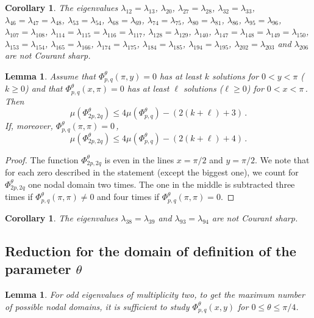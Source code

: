 \documentclass[a4paper,reqno,11pt]{amsart}
\newtheorem{lemma}[thm]{Lemma}
\newtheorem{cor}[thm]{Corollary}
\theoremstyle{remark}
\theoremstyle{definition}
\numberwithin{equation}{section}
\begin{document}
\begin{cor}
\label{cor:antimirror}
The eigenvalues 
$\lambda_{12}=\lambda_{13}$, 
$\lambda_{20}$, 
$\lambda_{27}=\lambda_{28}$, 
$\lambda_{32}=\lambda_{33}$, 
$\lambda_{46}=\lambda_{47}=\lambda_{48}$, 
$\lambda_{53}=\lambda_{54}$, 
$\lambda_{68}=\lambda_{69}$, 
$\lambda_{74}=\lambda_{75}$, 
$\lambda_{80}=\lambda_{81}$, 
$\lambda_{86}$, 
$\lambda_{95}=\lambda_{96}$, 
$\lambda_{107}=\lambda_{108}$, 
$\lambda_{114}=\lambda_{115}=\lambda_{116}=\lambda_{117}$, 
$\lambda_{128}=\lambda_{129}$, 
$\lambda_{140}$, 
$\lambda_{147}=\lambda_{148}=\lambda_{149}=\lambda_{150}$, 
$\lambda_{153}=\lambda_{154}$, 
$\lambda_{165}=\lambda_{166}$, 
$\lambda_{174}=\lambda_{175}$, 
$\lambda_{184}=\lambda_{185}$, 
$\lambda_{194}=\lambda_{195}$, 
$\lambda_{202}=\lambda_{203}$ and 
$\lambda_{206}$
are not Courant sharp.
\end{cor}

\begin{lemma}
\label{lem:pandqeven}
Assume   that
$\Phi_{p,q}^\theta(\pi,y)=0$ has at least $k$ solutions for $0<y<\pi$ 
($k\geq 0$) and that $\Phi_{p,q}^\theta(x,\pi)=0$ has at least $\ell $ solutions 
($\ell \geq 0$)  for $0<x<\pi$\,.
Then
\[
\mu(\Phi_{2p,2q}^\theta)\leq 4\mu(\Phi_{p,q}^\theta)-(2(k+\ell)+3)\,.
\]
If, moreover, $\Phi_{p,q}^\theta(\pi,\pi)= 0\,$,
\[
\mu(\Phi_{2p,2q}^\theta)\leq 4\mu(\Phi_{p,q}^\theta)-(2(k+\ell)+4)\,.
\]
\end{lemma}

\begin{proof}
The function $\Phi_{2p,2q}^{\theta}$ is even in the lines $x=\pi/2$ and 
$y=\pi/2$. We note that for each zero described in the statement (except the 
biggest one), we count for $\Phi_{2p,2q}^\theta$ one nodal domain two times. 
The one in the middle is subtracted three times if 
$\Phi_{p,q}^\theta(\pi,\pi)\neq 0$ and four
times if $\Phi_{p,q}^\theta(\pi,\pi)=0$.
\end{proof}

\begin{cor}
\label{cor:pandqeven}
The eigenvalues $\lambda_{38}=\lambda_{39}$ and $\lambda_{93}=\lambda_{94}$ 
are not Courant sharp.
\end{cor}

\subsection{Reduction for the domain of definition of the parameter $\theta$}

\begin{lemma}
\label{Lemma3.8}
For odd eigenvalues of multiplicity two, to get the maximum number of possible
nodal domains, it is sufficient to study $\Phi_{p,q}^{\theta}(x,y)$ for
$0\leq\theta\leq\pi/4$.
\end{lemma}
\end{document}
